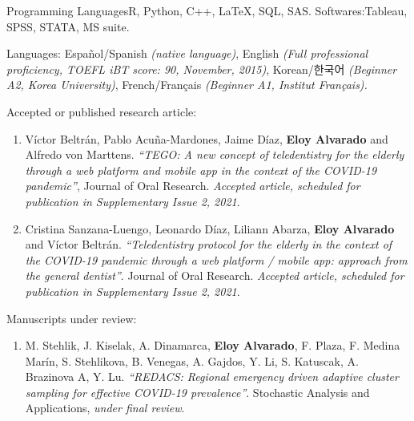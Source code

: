 \documentclass[10pt,a4paper]{article}
\begin{document}


\inlineheadsection
{Programming Languages}{R, Python, C++, \LaTeX, SQL, SAS.}
\inlineheadsection
{Softwares:}{Tableau, SPSS, STATA, MS suite.}


\inlineheadsection 
{Languages:}
{Español/Spanish \textit{(native language)}, English \textit{(Full professional proficiency, TOEFL iBT score: 90, November, 2015)}, Korean/한국어 \textit{(Beginner A2, Korea University)}, French/Français \textit{(Beginner A1, Institut Français).}}




\inlineheadsection 
{Accepted or published research article:}{}

\begin{enumerate}
\item Víctor Beltrán, Pablo Acuña-Mardones, Jaime Díaz, \textbf{Eloy Alvarado} and Alfredo von Marttens. \textit{``TEGO: A new concept of teledentistry for the elderly through a web platform and mobile app in the context of the COVID-19 pandemic''}, Journal of Oral Research. \textit{Accepted article, scheduled for publication in Supplementary Issue 2, 2021}.
\item Cristina Sanzana-Luengo, Leonardo Díaz, Liliann Abarza, \textbf{Eloy Alvarado} and Víctor Beltrán. \textit{``Teledentistry protocol for the elderly in the context of the COVID-19 pandemic through a web platform / mobile app: approach from the general dentist''}. Journal of Oral Research. \textit{Accepted article, scheduled for publication in Supplementary Issue 2, 2021}.
\end{enumerate}
\inlineheadsection 
{Manuscripts under review:}{}
\begin{enumerate}
\item M. Stehlik, J. Kiselak, A. Dinamarca, \textbf{Eloy Alvarado}, F. Plaza, F. Medina Marín, S. Stehlikova, B. Venegas, A. Gajdos, Y. Li, S. Katuscak, A. Brazinova A, Y. Lu. \textit{``REDACS: Regional emergency driven adaptive cluster sampling for effective COVID-19 prevalence''}. Stochastic Analysis and Applications, \textit{under final review}.
\end{enumerate}
\end{document}
